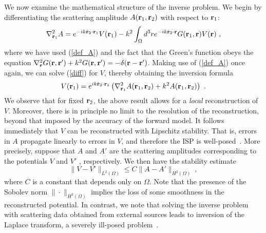 \documentclass[prl,twocolumn]{revtex4-1}
\newcommand{\lap}{\nabla^2}
\newcommand{\Br}{{\bf r}}
\begin{document}
We now examine the mathematical structure of the inverse problem. We begin by differentiating the scattering amplitude $A(\Br_1,\Br_2)$ with respect to $\Br_1$:
\begin{equation}
\label{diff}
\lap_{\Br_1}A = e^{-ik\hat\Br_2\cdot\Br_1}V(\Br_1) -k^2\int_\Omega d^3r e^{-ik\hat\Br_2\cdot\Br}G(\Br_1,\Br)V(\Br) \ ,
\end{equation}
where we have used (\ref{def_A}) and the fact that the Green's function obeys the equation $\lap_{\Br}G(\Br,\Br') + k^2G(\Br,\Br')=-\delta(\Br-\Br')$. Making use of
(\ref{def_A}) once again, we can solve (\ref{diff}) for $V$, thereby obtaining
the inversion formula
\begin{equation}
\label{inversion}
V(\Br_1) = e^{ik\hat\Br_2\cdot\Br_1}\left(\lap_{\Br_1} A(\Br_1,\Br_2) + k^2 A(\Br_1,\Br_2)\right) \ .
\end{equation}
We observe that for fixed $\Br_2$, the above result allows for a \emph{local} reconstruction of $V$. Moreover, there is in principle no limit to the resolution of the reconstruction, beyond that imposed by the accuracy of the forward model. It follows immediately that $V$ can be reconstructed with Lipschitz stability. That is, errors in $A$ propagate linearly to errors in $V$, and therefore the ISP is well-posed~\cite{natterer}. More precisely, suppose that $A$ and $A'$ are the scattering amplitudes corresponding to the potentials $V$ and $V'$ , respectively. We then have the stability estimate
\begin{equation}
\|V-V'\|_{L^2(\Omega)} \le C \|A-A'\|_{H^2(\Omega)} \ ,
\end{equation}
where $C$ is a constant that depends only on $\Omega$. Note that the presence of the Sobolev norm $\|\cdot\|_{H^2(\Omega)}$ implies the loss of some smoothness in the reconstructed potential. In contrast, we note that solving the inverse problem with scattering data obtained from external sources leads to inversion of the Laplace transform, a severely ill-posed problem~\cite{epstein}.
\end{document}
